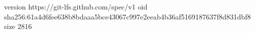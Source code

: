 version https://git-lfs.github.com/spec/v1
oid sha256:61a4d6fee638b8bdaaa5bce43067c997e2eeab4b36af5169187637f8d831dbf8
size 2816
